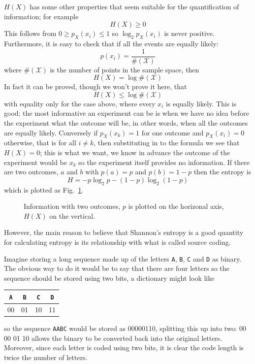 \documentclass[12pt]{article}
\begin{document}
$H(X)$ has some other properties that seem suitable for the
quantification of information; for example
\begin{equation}
H(X)\ge 0
\end{equation}
This follows from $0\ge p_X(x_i)\le 1$ so $\log_2{p_X(x_i)}$ is never
positive. Furthermore, it is easy to check that if all the events are equally likely:
\begin{equation}
p(x_i)=\frac{1}{\#(\mathcal{X})}
\end{equation}
where $\#(\mathcal{X})$ is the number of points in the sample space, then
\begin{equation}
H(X)=\log{\#(\mathcal{X})}
\end{equation}
In fact it can be proved, though we won't prove it here, that
\begin{equation}
H(X)\le \log{\#(\mathcal{X})}
\end{equation}
with equality only for the case above, where every $x_i$ is equally
likely. This is good; the most informative an experiment can be is
when we have no idea before the experiment what the outcome will be,
in other words, when all the outcomes are equally likely. Conversely
if $p_X(x_k)=1$ for one outcome and $p_X(x_i)=0$ otherwise, that is for
all $i\not=k$, then substituting in to the formula we see that
$H(X)=0$; this is what we want, we know in advance the outcome of the
experiment would be $x_k$ so the experiment itself provides no
information. If there are two outcomes, $a$ and $b$ with $p(a)=p$ and
$p(b)=1-p$ then the entropy is
\begin{equation}
H=-p\log_2{p}-(1-p)\log_2{(1-p)}
\end{equation}
which is plotted as Fig.~\ref{fig_two_outcomes}.

\begin{figure}
\begin{center}

\end{center}
\caption{Information with two outcomes, $p$ is plotted on the
  horizonal axis, $H(X)$ on the vertical.\label{fig_two_outcomes}}
\end{figure}

However, the main reason to believe that Shannon's entropy is a good
quantity for calculating entropy is its relationship with what is
called source coding. 

Imagine storing a long sequence made up of the letters \texttt{A}, \texttt{B}, \texttt{C} and \texttt{D}
as binary. The obvious way to do it would be to say that there are
four letters so the sequence should be stored using two bits, a
dictionary might look like
\begin{center}
\begin{tabular}{cccc}
\texttt{A}&\texttt{B}&\texttt{C}&\texttt{D}\\
\hline
00&01&10&11
\end{tabular}
\end{center}
so the sequence \texttt{AABC} would be stored as 00000110, splitting this up
into two: 00 00 01 10 allows the binary to be converted back into the
original letters. Moreover, since each letter is coded using two bits,
it is clear the code length is twice the number of letters. 
\end{document}
